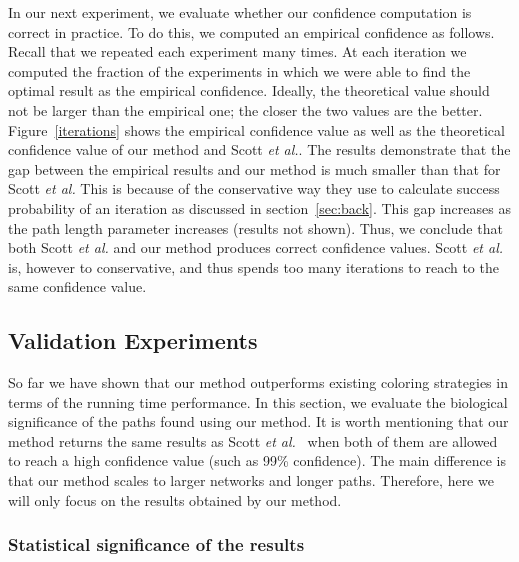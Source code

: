 \documentclass{ws-procs11x85}
\begin{document}
In our next experiment, we evaluate whether our confidence computation
is correct in practice.  To do this, we computed an empirical
confidence as follows.  Recall that we repeated each experiment many
times.  At each iteration we computed the fraction of the experiments
in which we were able to find the optimal result as the empirical
confidence.  Ideally, the theoretical value should not be larger than
the empirical one; the closer the two values are the better.
Figure~\ref{iterations} shows the empirical confidence value as well
as the theoretical confidence value of our method and Scott {\it et
  al.}.  The results demonstrate that the gap between the empirical
results and our method is much smaller than that for Scott {\it et
  al.}  This is because of the conservative way they use to calculate
success probability of an iteration as discussed in
section~\ref{sec:back}.  This gap increases as the path length
parameter increases (results not shown).  Thus, we conclude that both
Scott {\it et al.} and our method produces correct confidence values.
Scott {\it et al.} is, however to conservative, and thus spends too
many iterations to reach to the same confidence value.


\subsection{Validation Experiments}
\label{sec:validation}


So far we have shown that our method outperforms existing coloring
strategies in terms of the running time performance. In this section,
we evaluate the biological significance of the paths found using our
method.  It is worth mentioning that our method returns the same
results as Scott {\it et al.}~\cite{scott} when both of them are
allowed to reach a high confidence value (such as 99\% confidence).
The main difference is that our method scales to larger networks and
longer paths.  Therefore, here we will only focus on the results
obtained by our method.


\subsubsection{Statistical significance of the results}
\label{sec:zscore}
\end{document}
